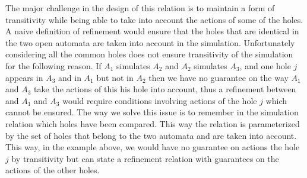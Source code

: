 \documentclass[runningheads]{llncs}
\begin{document}
The major challenge in the design of this relation is to maintain a form of transitivity while being able to take into account the actions of some of the holes. A naive definition of refinement would ensure that the holes that are identical in the two open automata are taken into account in the simulation. Unfortunately considering all the common holes does not ensure transitivity of the simulation for the following reason. If $A_1$ simulates $A_2$ and $A_2$ simulates $A_3$, and one hole $j$ appears in $A_3$ and in $A_1$ but not in $A_2$ then we have no guarantee on the way $A_1$ and $A_3$ take the actions of this his hole into account, thus  a refinement between and $A_1$ and $A_3$ would require conditions involving actions of the hole $j$ which cannot be ensured. The way we solve this issue is to remember in the simulation relation which holes have been compared. This way the relation is parameterized by the set of holes that belong to the two automata and are taken into account.
This way, in the example above, we would have no guarantee on actions the hole $j$ by transitivity but can state a refinement relation with guarantees on the actions of the other holes.
\end{document}
